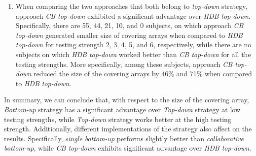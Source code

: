 \documentclass[conference]{IEEEtran}
\theoremstyle{definition}
\begin{document}
\begin{enumerate}
    \item When comparing the two approaches that both belong to \emph{top-down} strategy, approach \emph{CB top-down} exhibited a significant advantage over \emph{HDB top-down}. Specifically, there are 55, 44, 21, 10, and 0 subjects, on which approach \emph{CB top-down} generated smaller size of covering arrays when compared to \emph{HDB top-down} for testing strength 2, 3, 4, 5, and 6, respectively, while there are no subjects on which \emph{HDB top-down} worked better than \emph{CB top-down} for all the testing strengths. More specifically, among these subjects, approach \emph{CB top-down} reduced the size of the covering arrays by 46\% and 71\% when compared to \emph{HDB top-down}.
\end{enumerate}

In summary, we can conclude that, with respect to the size of the covering array, \emph{Bottom-up} strategy has a significant advantage over \emph{Top-down} strategy at low testing strengths, while \emph{Top-down} strategy works better at the high testing strength. Additionally, different implementations of the strategy also affect on the results. Specifically, \emph{single bottom-up} performs slightly better than \emph{collaborative bottom-up}, while \emph{CB top-down} exhibits significant advantage over \emph{HDB top-down}.

\end{document}
